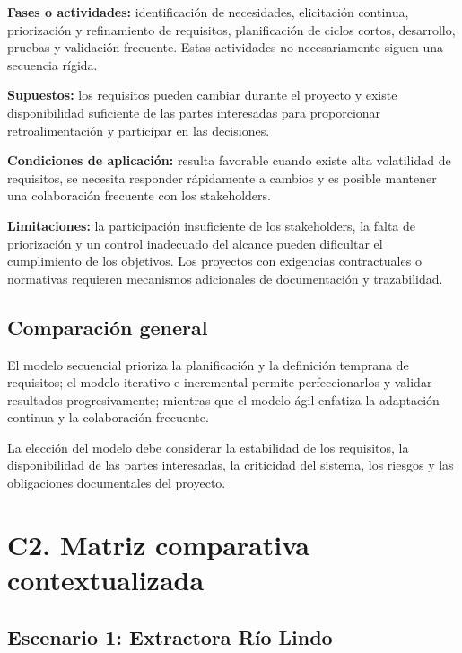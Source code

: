 \documentclass[12pt,a4paper]{article}
\begin{document}
\textbf{Fases o actividades:} identificación de necesidades, elicitación continua, priorización y refinamiento de requisitos, planificación de ciclos cortos, desarrollo, pruebas y validación frecuente. Estas actividades no necesariamente siguen una secuencia rígida.

\textbf{Supuestos:} los requisitos pueden cambiar durante el proyecto y existe disponibilidad suficiente de las partes interesadas para proporcionar retroalimentación y participar en las decisiones.

\textbf{Condiciones de aplicación:} resulta favorable cuando existe alta volatilidad de requisitos, se necesita responder rápidamente a cambios y es posible mantener una colaboración frecuente con los stakeholders.

\textbf{Limitaciones:} la participación insuficiente de los stakeholders, la falta de priorización y un control inadecuado del alcance pueden dificultar el cumplimiento de los objetivos. Los proyectos con exigencias contractuales o normativas requieren mecanismos adicionales de documentación y trazabilidad.

\subsection{Comparación general}

El modelo secuencial prioriza la planificación y la definición temprana de requisitos; el modelo iterativo e incremental permite perfeccionarlos y validar resultados progresivamente; mientras que el modelo ágil enfatiza la adaptación continua y la colaboración frecuente.

La elección del modelo debe considerar la estabilidad de los requisitos, la disponibilidad de las partes interesadas, la criticidad del sistema, los riesgos y las obligaciones documentales del proyecto.

\clearpage


\section{C2. Matriz comparativa contextualizada}

\subsection{Escenario 1: Extractora Río Lindo}
\end{document}
